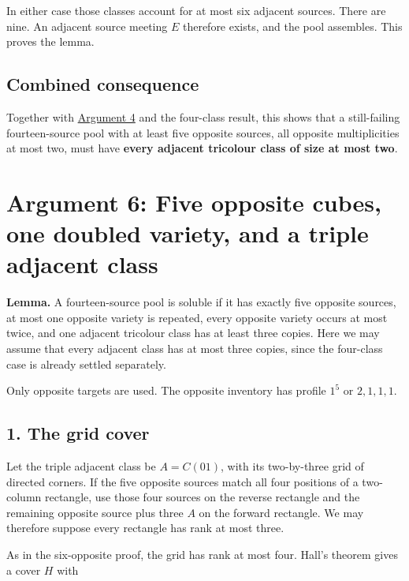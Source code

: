 \documentclass[
  10pt,
]{article}
\begin{document}
In either case those classes account for at most six adjacent sources.
There are nine. An adjacent source meeting \(E\) therefore exists, and
the pool assembles. This proves the lemma.

\hypertarget{combined-consequence}{%
\subsection*{Combined consequence}\label{combined-consequence}}

Together with \protect\hyperlink{arg-4}{Argument 4} and the four-class
result, this shows that a still-failing fourteen-source pool with at
least five opposite sources, all opposite multiplicities at most two,
must have \textbf{every adjacent tricolour class of size at most two}.

\hypertarget{arg-6}{%
\section{Argument 6: Five opposite cubes, one doubled variety, and a
triple adjacent class}\label{arg-6}}

\textbf{Lemma.} A fourteen-source pool is soluble if it has exactly five
opposite sources, at most one opposite variety is repeated, every
opposite variety occurs at most twice, and one adjacent tricolour class
has at least three copies. Here we may assume that every adjacent class
has at most three copies, since the four-class case is already settled
separately.

Only opposite targets are used. The opposite inventory has profile
\(1^5\) or \(2,1,1,1\).

\hypertarget{the-grid-cover}{%
\subsection*{1. The grid cover}\label{the-grid-cover}}

Let the triple adjacent class be \(A=C(01)\), with its two-by-three grid
of directed corners. If the five opposite sources match all four
positions of a two-column rectangle, use those four sources on the
reverse rectangle and the remaining opposite source plus three \(A\) on
the forward rectangle. We may therefore suppose every rectangle has rank
at most three.

As in the six-opposite proof, the grid has rank at most four. Hall's
theorem gives a cover \(H\) with
\end{document}
